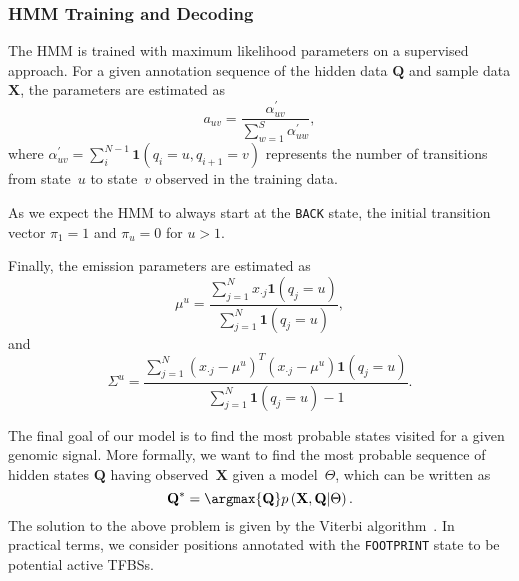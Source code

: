 \subsubsection{HMM Training and Decoding}
\label{sec:hmm.training.decoding}


The HMM is trained with maximum likelihood parameters on a supervised
approach. For a given annotation sequence of the hidden data $\mathbf{Q}$ and
sample data $\mathbf{X}$, the parameters are estimated as
\begin{equation}
    a_{uv} = \frac{ \alpha^{\prime}_{uv}}{ \sum_{w=1}^{S} \alpha^{\prime}_{uw}},
    \label{eq:train1}
\end{equation}
where $\alpha^{\prime}_{uv}=\sum_i^{N-1} \mathbf{1} (q_i=u,q_{i+1}=v)$
represents the number of transitions from state~$u$ to state~$v$
observed in the training data. 

As we expect the HMM to always start at the {\tt BACK} state, the initial
transition vector $\pi_1=1$ and $\pi_u=0$ for $u > 1$. 

Finally, the emission parameters are estimated as
\begin{equation}
\mu^{u} = \frac{ \sum_{j=1}^{N} {x}_{\cdot j} {\mathbf{1}}(q_j=u) }{ \sum_{j=1}^{N} {\mathbf{1}} (q_j=u) },
    \label{eq:train2}
\end{equation}
and
\begin{equation}
    {\Sigma}^{u} =  \frac{ \sum_{j=1}^{N} ({x}_{\cdot j} - {\mu}^{u})^T({x}_{\cdot j} - {\mu}^{u}) {\mathbf{1}} (q_j=u)}
                         { \sum_{j=1}^{N} {\mathbf{1}} (q_j=u)  - 1}.
    \label{eq:train3}
\end{equation}

The final goal of our model is to find the most probable states
visited for a given genomic signal. More formally, we want to find the
most probable sequence of hidden states $ \mathbf{Q}$ having
observed~$\mathbf{X}$ given a model~$ \Theta$, which can be written as
\begin{equation}
    \mathbf{Q^*} = \argmax{\mathbf{Q}} p\left(\mathbf{X},\mathbf{Q}|\Theta\right).
    \label{eq:viterbi1}
\end{equation}
The solution to the above problem is given by the Viterbi algorithm~\cite{rabiner1989}.
In practical terms, we consider positions annotated with the {\tt FOOTPRINT}
state to be potential active TFBSs.

